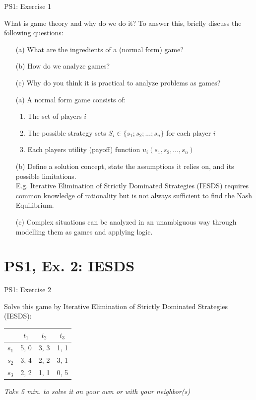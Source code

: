 \begin{frame}{PS1: Exercise 1}
\begin{multicols}{2}
What is game theory and why do we do it? To answer this, briefly discuss the following questions:
\begin{itemize}
  \item[(a)] What are the ingredients of a (normal form) game?
  \item[(b)] How do we analyze games?
  \item[(c)] Why do you think it is practical to analyze problems as games?
\end{itemize}
\vfill\null \columnbreak
\begin{itemize}
  \item[(a)] A normal form game consists of:
    \begin{enumerate}
      \item The set of players $i$
      \item The possible strategy sets $S_i\in \{s_1;s_2;...;s_n\}$ for each player $i$
      \item Each players utility (payoff) function $u_i(s_1,s_2,...,s_n)$
    \end{enumerate}
  \item[(b)] Define a solution concept, state the assumptions it relies on, and its possible limitations.\\
  E.g. Iterative Elimination of Strictly Dominated Strategies (IESDS) requires common knowledge of rationality but is not always sufficient to find the Nash Equilibrium.
  \item[(c)] Complex situations can be analyzed in an unambiguous way through modelling them as games and applying logic.
\end{itemize}
\vfill\null
\end{multicols}
\end{frame}


\section{PS1, Ex. 2: IESDS}

\begin{frame}{PS1: Exercise 2}
\begin{multicols}{2}
Solve this game by Iterative Elimination of Strictly Dominated Strategies (IESDS):
\begin{table}
  \begin{tabular}{c|c|c|c}
          & $t_1$ & $t_2$ & $t_3$ \\
    \midrule
    $s_1$ & 5, 0  & 3, 3  & 1, 1 \\
    \midrule
    $s_2$ & 3, 4  & 2, 2  & 3, 1 \\
    \midrule
    $s_3$ & 2, 2  & 1, 1  & 0, 5
  \end{tabular}
\end{table}
\vfill\null \columnbreak
\textit{Take 5 min. to solve it on your own or with your neighbor(s)}
\vfill\null
\end{multicols}
\end{frame}

